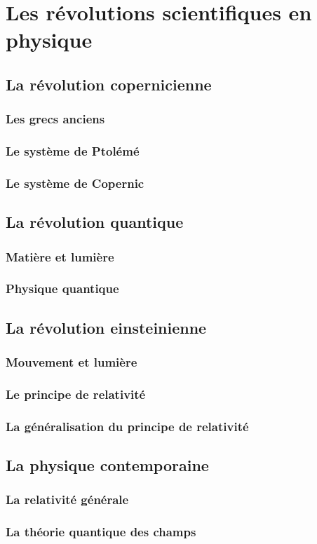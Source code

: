 \section{Les révolutions scientifiques en physique}
  \subsection{La révolution copernicienne}
    \subsubsection{Les grecs anciens}
    \subsubsection{Le système de Ptolémé}
    \subsubsection{Le système de Copernic}

  \subsection{La révolution quantique}
    \subsubsection{Matière et lumière}
    \subsubsection{Physique quantique}

  \subsection{La révolution einsteinienne}
    \subsubsection{Mouvement et lumière}
    \subsubsection{Le principe de relativité}
    \subsubsection{La généralisation du principe de relativité}

\subsection{La physique contemporaine}
  \subsubsection{La relativité générale}
  \subsubsection{La théorie quantique des champs}
  \subsubsection{}




